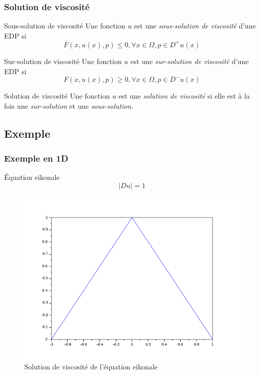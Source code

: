 \documentclass[10pt]{beamer}
\begin{document}
\begin{frame}

\frametitle{Solution de viscosité}
\begin{block}{Sous-solution de viscosité}
Une fonction $u$ est une \emph{sous-solution de viscosité} d'une EDP si 
$$F(x,u(x),p) \leq 0, \forall x \in \Omega, p \in D^{+}u(x) $$
\end{block}

\begin{block}{Sur-solution de viscosité}
Une fonction $u$ est une \emph{sur-solution de viscosité} d'une EDP si 
$$F(x,u(x),p) \geq 0, \forall x \in \Omega, p \in D^{-}u(x) $$
\end{block}

\begin{block}{Solution de viscosité}
Une fonction $u$ est une \emph{solution de viscosité} si elle est à la fois
une \emph{sur-solution} et une \emph{sous-solution}.
\end{block}
\end{frame}

\subsection{Exemple}

\begin{frame}
\frametitle{Exemple en 1D}
\begin{block}{Équation eikonale}
$$|Du| = 1 $$
\end{block}

\begin{figure}
\begin{center}
\includegraphics[scale=0.22]{eikonale.png}
\caption{Solution de viscosité de l'équation eikonale}
\end{center}
\end{figure}

\end{frame}
\end{document}
